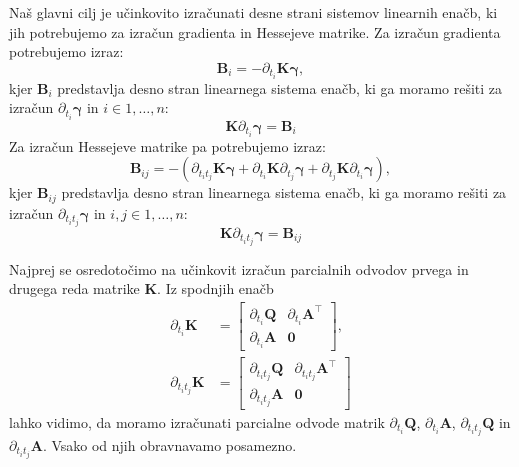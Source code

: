 \documentclass[isrm2, tisk]{fmfdelo}
\newcommand{\yimplicit}{\mathbf{\gamma}}
\newcommand{\qmat}{\mathbf{Q}}
\newcommand{\amat}{\mathbf{A}}
\newcommand{\kmat}{\mathbf{K}}
\begin{document}
Naš glavni cilj je učinkovito izračunati desne strani sistemov linearnih enačb, ki jih potrebujemo za izračun gradienta in Hessejeve matrike. Za izračun gradienta potrebujemo izraz:
\begin{equation}
\mathbf{B}_i = - \partial_{t_i}\kmat \yimplicit,
\end{equation}
kjer $\mathbf{B}_i$ predstavlja desno stran linearnega sistema enačb, ki ga moramo rešiti za izračun $\partial_{t_i} \yimplicit$ in $i \in 1, \ldots, n$:
\begin{equation}
\kmat \partial_{t_i} \yimplicit = \mathbf{B}_i
\end{equation}
Za izračun Hessejeve matrike pa potrebujemo izraz:
\begin{equation}
\mathbf{B}_{ij} = - (\partial_{t_it_j} \mathbf{K} \yimplicit
    + \partial_{t_i} \mathbf{K} \partial_{t_j}\yimplicit
    + \partial_{t_j} \mathbf{K} \partial_{t_i}\yimplicit),
\end{equation}
kjer $\mathbf{B}_{ij}$ predstavlja desno stran linearnega sistema enačb, ki ga moramo rešiti za izračun $\partial_{t_it_j} \yimplicit$ in $i,j \in 1, \ldots, n$:
\begin{equation}
\kmat \partial_{t_it_j}\yimplicit = \mathbf{B}_{ij}
\end{equation}

Najprej se osredotočimo na učinkovit izračun parcialnih odvodov prvega in drugega reda matrike $\kmat$. Iz spodnjih enačb
\begin{equation}
    \begin{aligned}
        \partial_{t_i}\kmat &= \begin{bmatrix}
            \partial_{t_i}\qmat & \partial_{t_i} \amat^{\top} \\
            \partial_{t_i} \amat & \mathbf{0}
        \end{bmatrix}, \\
        \partial_{t_it_j}\kmat &= \begin{bmatrix}
            \partial_{t_it_j}\qmat & \partial_{t_it_j} \amat^{\top} \\
            \partial_{t_it_j} \amat & \mathbf{0}
        \end{bmatrix}
    \end{aligned}
\end{equation}
lahko vidimo, da moramo izračunati parcialne odvode matrik $\partial_{t_i}\qmat$, $\partial_{t_i} \amat$, $\partial_{t_it_j}\qmat$ in $\partial_{t_it_j} \amat$. Vsako od njih obravnavamo posamezno.
\end{document}
